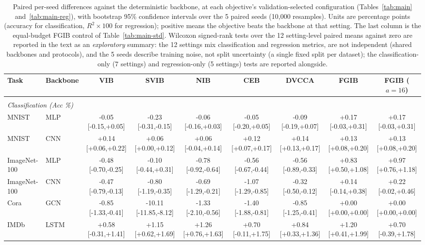 \begin{table}[t]
\caption{Paired per-seed differences against the deterministic backbone, at each objective's validation-selected configuration (Tables~\ref{tab:main} and~\ref{tab:main-reg}), with bootstrap 95\% confidence intervals over the 5 paired seeds (10{,}000 resamples). Units are percentage points (accuracy for classification, $R^2\times100$ for regression); positive means the objective beats the backbone at that setting. The last column is the equal-budget FGIB control of Table~\ref{tab:main-std}. Wilcoxon signed-rank tests over the 12 setting-level paired means against zero are reported in the text as an \emph{exploratory} summary: the 12 settings mix classification and regression metrics, are not independent (shared backbones and protocols), and the 5 seeds describe training noise, not split uncertainty (a single fixed split per dataset); the classification-only (7 settings) and regression-only (5 settings) tests are reported alongside.}
\label{tab:paired}
\begin{center}\small
\begin{tabular}{llccccccc}
Task & Backbone & VIB & SVIB & NIB & CEB & DVCCA & FGIB & FGIB ($a{=}16$) \\ \hline \\[-1.8ex]
\multicolumn{9}{l}{\emph{Classification (Acc \%)}} \\[0.3ex]
MNIST & MLP & -0.05 [-0.15,+0.05] & -0.23 [-0.31,-0.15] & -0.06 [-0.16,+0.03] & -0.05 [-0.20,+0.05] & -0.09 [-0.19,+0.07] & +0.17 [-0.03,+0.31] & +0.17 [-0.03,+0.31] \\
MNIST & CNN & +0.14 [+0.06,+0.22] & +0.06 [+0.00,+0.12] & +0.06 [-0.04,+0.14] & +0.12 [+0.07,+0.17] & +0.14 [+0.13,+0.17] & +0.13 [+0.08,+0.20] & +0.13 [+0.08,+0.20] \\
ImageNet-100 & MLP & -0.48 [-0.70,-0.25] & -0.10 [-0.44,+0.31] & -0.78 [-0.92,-0.64] & -0.56 [-0.67,-0.44] & -0.56 [-0.89,-0.33] & +0.83 [+0.50,+1.08] & +0.97 [+0.76,+1.18] \\
ImageNet-100 & CNN & -0.47 [-0.79,-0.13] & -0.80 [-1.19,-0.35] & -0.69 [-1.29,-0.21] & -1.07 [-1.29,-0.85] & -0.32 [-0.50,-0.12] & +0.14 [-0.14,+0.38] & +0.22 [-0.02,+0.46] \\
Cora & GCN & -0.85 [-1.33,-0.41] & -10.11 [-11.85,-8.12] & -1.33 [-2.10,-0.56] & -1.40 [-1.88,-0.81] & -0.85 [-1.25,-0.41] & +0.00 [+0.00,+0.00] & +0.00 [+0.00,+0.00] \\
IMDb & LSTM & +0.58 [-0.31,+1.41] & +1.15 [+0.62,+1.69] & +1.26 [+0.76,+1.63] & +0.70 [-0.11,+1.75] & +0.84 [+0.33,+1.36] & +1.20 [+0.41,+1.99] & +0.70 [-0.39,+1.78] \\

\end{tabular}
\end{center}
\end{table}
